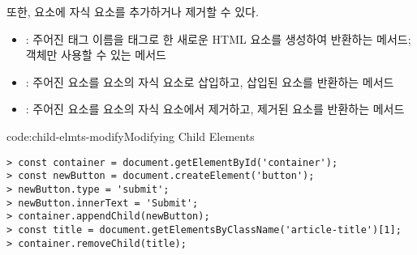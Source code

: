 또한, 요소에 자식 요소를 추가하거나 제거할 수 있다.

\begin{itemize}
    \item {}: 주어진 태그 이름을 태그로 한 새로운 HTML 요소를 생성하여 반환하는 메서드;  객체만 사용할 수 있는 메서드
    \item {}: 주어진 요소를 요소의 자식 요소로 삽입하고, 삽입된 요소를 반환하는 메서드
    \item {}: 주어진 요소를 요소의 자식 요소에서 제거하고, 제거된 요소를 반환하는 메서드
\end{itemize}

\begin{codeenv}{code:child-elmts-modify}{Modifying Child Elements}\begin{verbatim}
> const container = document.getElementById('container');
> const newButton = document.createElement('button');
> newButton.type = 'submit';
> newButton.innerText = 'Submit';
> container.appendChild(newButton);
> const title = document.getElementsByClassName('article-title')[1];
> container.removeChild(title);
\end{verbatim}
\end{codeenv}
